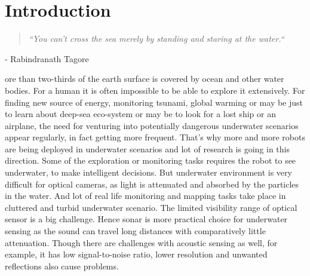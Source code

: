 
\chapter{Introduction}
\label{chap:intro}
\newcommand{\chapquote}[3]{\begin{quotation} \textit{#1} \end{quotation} \begin{flushright} - #2\end{flushright} }

\chapquote{``You can't cross the sea merely by standing and staring at the water.``}{Rabindranath Tagore}



More than two-thirds of the earth surface is covered by ocean and other water bodies. For a human it is often impossible to be able to explore it extensively. 
For finding new source of energy, monitoring tsunami, global warming or may be just to learn about deep-sea eco-system or may be to look for a lost ship or an airplane, the need for venturing into potentially dangerous 
underwater scenarios appear regularly, in fact getting more frequent. That's why more and more robots are being deployed in underwater scenarios and lot of research is going in this direction.
Some of the exploration or monitoring tasks requires the robot to see underwater, to make intelligent decisions.
But underwater environment is very difficult for optical cameras, as light is attenuated and absorbed by the particles in the water. And lot of real life monitoring and mapping 
tasks take place in cluttered and turbid underwater scenario. The limited visibility range of optical sensor is a big challenge. Hence sonar is more practical choice for underwater sensing as the sound can travel 
long distances with comparatively little attenuation. Though there are challenges with acoustic sensing as well, for example, it has low signal-to-noise ratio, lower resolution and unwanted reflections also cause problems. \\



